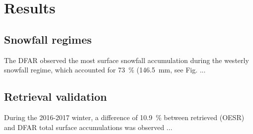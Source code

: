 \chapter{Results}\label{ch:res}
\section{Snowfall regimes}\label{sec:snowfall_regimes}

The DFAR observed the most surface snowfall accumulation during the westerly snowfall regime, which accounted for \SI{73}{\percent} (\SI{146.5}{\mm}, see Fig. ...

\section{Retrieval validation}
During the 2016-2017 winter, a difference of \SI{10.9}{\percent} between retrieved (OESR) and DFAR total surface accumulations was observed ...